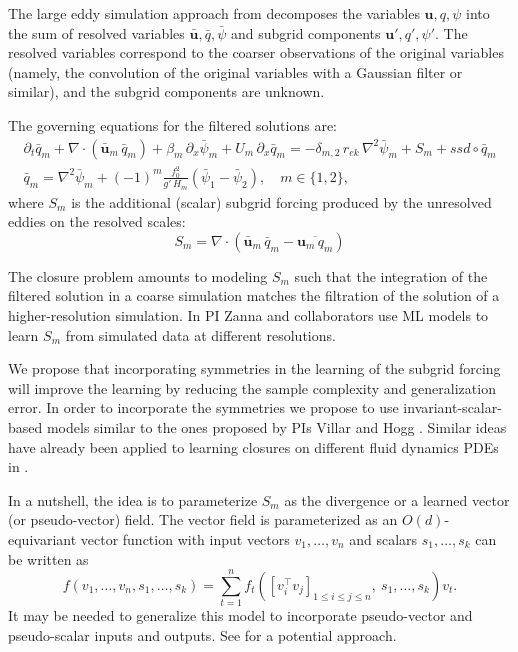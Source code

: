 \documentclass[11pt]{article}
\begin{document}
The large eddy simulation approach from \cite{sagaut2005large} decomposes the variables $\mathbf u, q, \psi$ into the sum of resolved variables $\bar{\mathbf u}, \bar q, \bar \psi$ and subgrid components  $\mathbf u', q', \psi'$. The resolved variables correspond to the coarser observations of the original variables (namely, the convolution of the original variables with a Gaussian filter or similar), and the subgrid components are unknown. 

The governing equations for the filtered solutions are:
\begin{align}
    \partial_t \bar q_m + \nabla\cdot (\bar{\mathbf u}_m\,\bar q_m) + \beta_m\,\partial_x \bar \psi_m + U_m\,\partial_x \bar q_m = -\delta_{m,2}\,r_{ek}\,\nabla^2\bar \psi_m + S_m +ssd\circ \bar q_m \\
    \bar q_m = \nabla^2\bar\psi_m+(-1)^m\frac{f_0^2}{g'\,H_m}(\bar \psi_1-\bar \psi_2), \quad m\in\{1,2\},
\end{align}
where $S_m$ is the additional (scalar) subgrid forcing produced by the unresolved eddies on the resolved scales:
\begin{equation}
    S_m = \nabla \cdot (\bar{\mathbf u}_m\,\bar q_m - \overline{\mathbf u_m\,q_m})
\end{equation}

The closure problem amounts to modeling $S_m$ such that the integration of the filtered solution in a coarse simulation matches the filtration of the solution of a higher-resolution simulation. In \cite{perezhogin2023generative} PI Zanna and collaborators use ML models to learn $S_m$ from simulated data at different resolutions. 

We propose that incorporating symmetries in the learning of the subgrid forcing will improve the learning by reducing the sample complexity and generalization error. In order to incorporate the symmetries we propose to use invariant-scalar-based models similar to the ones proposed by PIs Villar and Hogg \cite{villar2021scalars}. Similar ideas have already been applied to learning closures on different fluid dynamics PDEs in \cite{xu2022pde}.

In a nutshell, the idea is to parameterize $S_m$ as the divergence or a learned vector (or pseudo-vector) field. The vector field is parameterized as an $O(d)$-equivariant vector function with input vectors $v_1,\ldots, v_n$ and scalars $s_1,\ldots, s_k$ can be written as 
$$f(v_1,\ldots, v_n, s_1,\ldots, s_k) = \sum_{t=1}^n f_t([v_i^\top v_j]_{1\leq i \leq j \leq n },\ s_1, \ldots, s_k)v_t.$$
It may be needed to generalize this model to incorporate pseudo-vector and pseudo-scalar inputs and outputs. See \cite{gregory2023geometricimagenet} for a potential approach.
\end{document}
